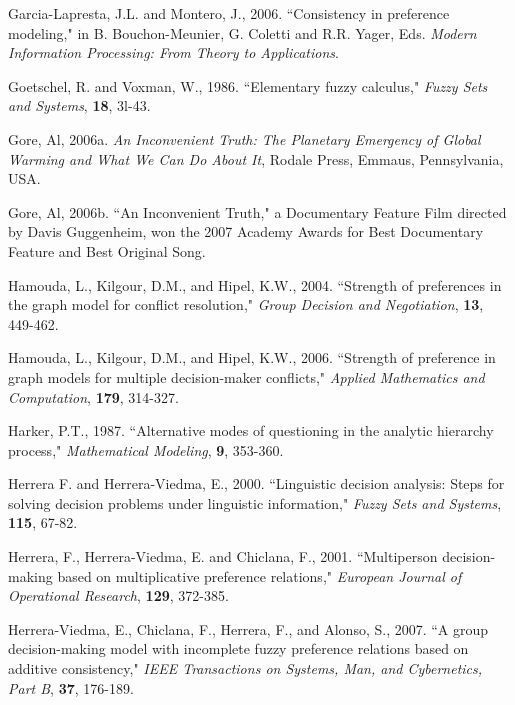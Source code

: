 \documentclass[letterpaper,12pt,titlepage,oneside,final]{book}
\begin{document}
\begin{thebibliography}{}
Garcia-Lapresta, J.L. and Montero, J., 2006. ``Consistency in preference modeling," in B. Bouchon-Meunier, G. Coletti and R.R. Yager, Eds. \emph{Modern Information Processing: From Theory to Applications}.

Goetschel, R. and Voxman, W., 1986. ``Elementary fuzzy calculus," {\em Fuzzy Sets and Systems}, {\bf 18}, 3l-43.

Gore, Al, 2006a. \emph{An Inconvenient Truth: The Planetary Emergency of Global Warming and What We Can Do About It}, Rodale Press, Emmaus, Pennsylvania, USA.

Gore, Al, 2006b. ``An Inconvenient Truth," a Documentary Feature Film directed by Davis Guggenheim, won the 2007 Academy Awards for Best Documentary Feature and Best Original Song.

Hamouda, L., Kilgour, D.M., and Hipel, K.W., 2004. ``Strength of preferences in the graph model for conflict resolution," \emph{Group Decision and Negotiation}, {\bf 13}, 449-462.

Hamouda, L., Kilgour, D.M., and Hipel, K.W., 2006. ``Strength of preference in graph models for multiple decision-maker conflicts," \emph{Applied Mathematics and Computation}, {\bf 179}, 314-327.

Harker, P.T., 1987. ``Alternative modes of questioning in the analytic hierarchy process," \emph{Mathematical Modeling}, {\bf 9}, 353-360.

Herrera F. and Herrera-Viedma, E., 2000. ``Linguistic decision analysis: Steps for solving decision problems under linguistic information," \emph{Fuzzy Sets and Systems}, {\bf 115}, 67-82.

Herrera, F., Herrera-Viedma, E. and Chiclana, F., 2001. ``Multiperson decision-making based on multiplicative preference relations," \emph{European Journal of Operational Research}, {\bf 129}, 372-385.

Herrera-Viedma, E., Chiclana, F., Herrera, F., and Alonso, S., 2007. ``A group decision-making model with incomplete fuzzy preference relations based on additive consistency," \emph{IEEE Transactions on Systems, Man, and Cybernetics, Part B}, {\bf 37}, 176-189.


\end{thebibliography}
\end{document}
